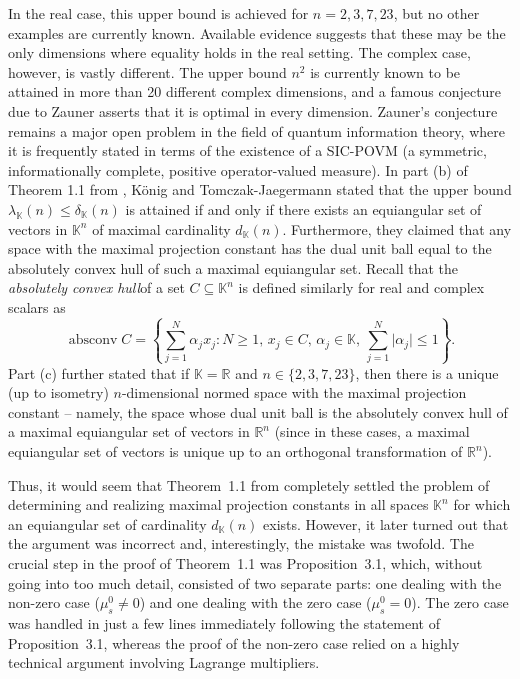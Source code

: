 \documentclass[12pt, reqno]{amsart}
\theoremstyle{definition}
\theoremstyle{remark}
\numberwithin{equation}{section}
\DeclareMathOperator{\absconv}{absconv}
\begin{document}
In the real case, this upper bound is achieved for $n=2, 3, 7, 23$, but no other examples are currently known. Available evidence suggests that these may be the only dimensions where equality holds in the real setting. The complex case, however, is vastly different. The upper bound $n^2$ is currently known to be attained in more than 20 different complex dimensions, and a famous conjecture due to Zauner \cite{zauner} asserts that it is optimal in every dimension. Zauner's conjecture remains a major open problem in the field of quantum information theory, where it is frequently stated in terms of the existence of a SIC-POVM (a symmetric, informationally complete, positive operator-valued measure). In part (b) of Theorem 1.1 from \cite{konigtomczak}, K\"onig and Tomczak-Jaegermann stated that the upper bound $\lambda_{\mathbb{K}}(n) \leq \delta_{\mathbb{K}}(n)$ is attained if and only if there exists an equiangular set of vectors in $\mathbb{K}^n$ of maximal cardinality $d_{\mathbb{K}}(n)$. Furthermore, they claimed that any space with the maximal projection constant has the dual unit ball equal to the absolutely convex hull of such a maximal equiangular set. Recall that the \emph{absolutely convex hull}of a set $C \subseteq \mathbb{K}^n$ is defined similarly for real and complex scalars as
$$\absconv C = \left\{ \sum_{j=1}^{N} \alpha_j x_j : N \geq 1, \, x_j \in C, \, \alpha_j \in \mathbb{K}, \, \sum_{j=1}^{N} \vert{}\alpha_j\vert{} \le 1 \right\}.$$
Part (c) further stated that if $\mathbb{K}=\mathbb{R}$ and $n \in \{2, 3, 7, 23\}$, then there is a unique (up to isometry) $n$-dimensional normed space with the maximal projection constant -- namely, the space whose dual unit ball is the absolutely convex hull of a maximal equiangular set of vectors in $\mathbb{R}^n$ (since in these cases, a maximal equiangular set of vectors is unique up to an orthogonal transformation of $\mathbb{R}^n$).

Thus, it would seem that Theorem~1.1 from \cite{konigtomczak} completely settled the problem of determining and realizing maximal projection constants in all spaces $\mathbb{K}^n$ for which an equiangular set of cardinality $d_{\mathbb{K}}(n)$ exists. However, it later turned out that the argument was incorrect and, interestingly, the mistake was twofold. The crucial step in the proof of Theorem~1.1 was Proposition~3.1, which, without going into too much detail, consisted of two separate parts: one dealing with the non-zero case ($\mu_s^0 \neq 0$) and one dealing with the zero case ($\mu_s^0 = 0$). The zero case was handled in just a few lines immediately following the statement of Proposition~3.1, whereas the proof of the non-zero case relied on a highly technical argument involving Lagrange multipliers.
\end{document}
